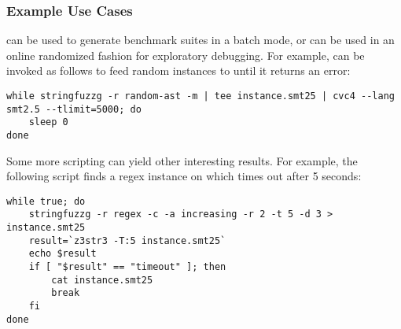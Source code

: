 \subsubsection{Example Use Cases}

\fuzzer{} can be used to
generate benchmark suites in a batch mode, or can be used in an online
randomized fashion for exploratory debugging. For example, \fuzzer{}
can be invoked as follows to feed random instances to \cvc{} until it
returns an error:
{\scriptsize\begin{verbatim}
while stringfuzzg -r random-ast -m | tee instance.smt25 | cvc4 --lang smt2.5 --tlimit=5000; do
    sleep 0
done\end{verbatim}}

Some more \unix{} scripting can yield other interesting results. For
example, the following script finds a regex instance on which \us{}
times out after 5 seconds:
{\scriptsize\begin{verbatim}while true; do
    stringfuzzg -r regex -c -a increasing -r 2 -t 5 -d 3 > instance.smt25
    result=`z3str3 -T:5 instance.smt25`
    echo $result
    if [ "$result" == "timeout" ]; then
        cat instance.smt25
        break
    fi
done\end{verbatim}}
